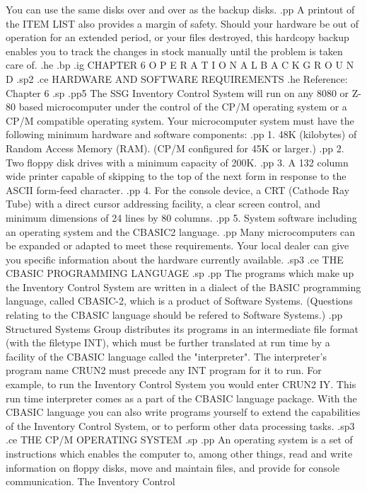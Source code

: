 You can use the same disks over and over as the backup disks.
.pp
A printout of the ITEM LIST also provides a margin of safety.  Should your
hardware be out of operation for an extended period, or your files
destroyed, this hardcopy backup enables you to track the changes in
stock manually until the problem is taken care of.
.he
.bp
.ig
CHAPTER 6
O P E R A T I O N A L	 B A C K G R O U N D
.sp2
.ce
HARDWARE AND SOFTWARE REQUIREMENTS
.he Reference: Chapter 6
.sp
.pp5
The SSG Inventory Control System
will run on any 8080 or Z-80 based microcomputer
under the control of the CP/M operating system or a CP/M compatible
operating system.  Your microcomputer system must have the following
minimum hardware and software components:
.pp
1.  48K (kilobytes) of Random Access Memory (RAM).  (CP/M configured for
45K or larger.)
.pp
2.  Two floppy disk drives with a minimum capacity of 200K.
.pp
3.  A 132 column wide printer capable of skipping to the top of the next
form in response to the ASCII form-feed character.
.pp
4.  For the console device, a CRT (Cathode Ray Tube) with a direct cursor
addressing facility, a clear screen control, and
minimum dimensions
of 24 lines by 80 columns.
.pp
5.  System software including an operating system and the CBASIC2 language.
.pp
Many microcomputers can be expanded or adapted to meet these requirements.
Your local dealer can give you specific information about the hardware
currently available.
.sp3
.ce
THE CBASIC PROGRAMMING LANGUAGE
.sp
.pp
The programs which make up the Inventory Control System are written
in a dialect of the BASIC programming language, called CBASIC-2,
which is a product of Software Systems. (Questions relating to
the CBASIC language should be refered to Software Systems.)
.pp
Structured Systems Group distributes its programs in an intermediate
file format (with the filetype INT), which must be further translated
at run time by a
facility of the CBASIC language called the "interpreter".  The interpreter's
program name CRUN2 must precede any INT program for it to run.
For example, to run the Inventory Control System you would enter CRUN2 IY.
This run time interpreter comes as a part of the CBASIC
language package.
With the CBASIC language you
can also write programs yourself to extend the capabilities
of the Inventory Control
System, or to perform other data processing tasks.
.sp3
.ce
THE CP/M OPERATING SYSTEM
.sp
.pp
An operating system is a set of instructions which enables the computer to,
among other things, read and write information on floppy disks, move and
maintain files, and provide for console communication.	The Inventory Control
